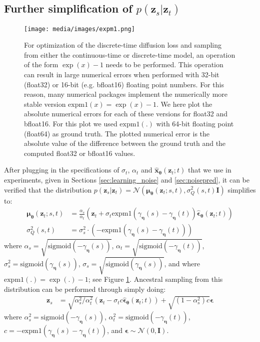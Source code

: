 \documentclass{article}
\def\rvx{{\mathbf{x}}}
\def\rvz{{\mathbf{z}}}
\newcommand{\sigmoid}{\sigma}
\newcommand{\bT}{{\boldsymbol{\theta}}}
\newcommand{\boldeta}{{\boldsymbol{\eta}}}
\newcommand{\bfI}{\mathbf{I}}
\newcommand{\bepsilon}{{\boldsymbol{\epsilon}}}
\newcommand{\bmu}{{\boldsymbol{\mu}}}
\begin{document}
\subsection{Further simplification of $p(\rvz_s|\rvz_t)$}
\label{sec:sampling}

\begin{figure}[t]
    \centering
    \texttt{[image: media/images/expm1.png]}
    \caption{For optimization of the discrete-time diffusion loss and sampling from either the continuous-time or discrete-time model, an operation of the form $\exp(x)-1$ needs to be performed. This operation can result in large numerical errors when performed with 32-bit (float32) or 16-bit (e.g. bfloat16) floating point numbers. For this reason, many numerical packages implement the numerically more stable version $\text{expm1}(x) = \exp(x)-1$. We here plot the absolute numerical errors for each of these versions for float32 and bfloat16. For this plot we used $\text{expm1}(.)$ with 64-bit floating point (float64) as ground truth. The plotted numerical error is the absolute value of the difference between the ground truth and the computed float32 or bfloat16 values.}
    \label{fig:expm1}
\end{figure}

After plugging in the specifications of $\sigma_t$, $\alpha_t$ and $\hat{\rvx}_{\bT}(\rvz_t; t)$ that we use in experiments, given in Sections \ref{sec:learning_noise} and \ref{sec:noisepred}, it can be verified that the distribution $p(\rvz_s|\rvz_t) = \mathcal{N}(\bmu_{\bT}(\rvz_{t}; s, t), \sigma^2_Q(s,t) \bfI)$ simplifies to:
\begin{align}
\bmu_{\bT}(\rvz_{t}; s, t) &= \frac{\alpha_s}{\alpha_t}\left( \rvz_t +
\sigmoid_t
\text{expm1}(\gamma_{\boldeta}(s)-\gamma_{\boldeta}(t)) \hat{\bepsilon}_{\bT}(\rvz_t; t) \right)
\\
\sigma^2_Q(s,t) &= \sigma^2_s \cdot (- \text{expm1}(\gamma_{\boldeta}(s)-\gamma_{\boldeta}(t)))
\end{align}
where $\alpha_s = \sqrt{\text{sigmoid}(-\gamma_{\boldeta}(s))}$, $\alpha_t = \sqrt{\text{sigmoid}(-\gamma_{\boldeta}(t))}$, $\sigmoid^2_s = \text{sigmoid}(\gamma_{\boldeta}(s))$, $\sigmoid_s = \sqrt{\text{sigmoid}(\gamma_{\boldeta}(s))}$, and where $\text{expm1}(.) = \exp(.)-1$; see Figure \ref{fig:expm1}. Ancestral sampling from this distribution can be performed through simply doing:
\begin{align}
\rvz_s &= \sqrt{\alpha^2_s/\alpha^2_t}(\rvz_t - \sigmoid_t c  \hat{\bepsilon}_{\bT}(\rvz_t; t)) + \sqrt{(1-\alpha^2_s) c} \bepsilon
\end{align}
where $\alpha^2_s = \text{sigmoid}(-\gamma_{\boldeta}(s))$, $\alpha^2_t = \text{sigmoid}(-\gamma_{\boldeta}(t))$, $c = -\text{expm1}(\gamma_{\boldeta}(s) - \gamma_{\boldeta}(t))$, and $\bepsilon \sim \mathcal{N}(0,\bfI)$.
\end{document}
